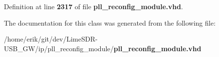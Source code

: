 Definition at line {\bf 2317} of file {\bf pll\+\_\+reconfig\+\_\+module.\+vhd}.



The documentation for this class was generated from the following file\+:\begin{DoxyCompactItemize}
\item 
/home/erik/git/dev/\+Lime\+S\+D\+R-\/\+U\+S\+B\+\_\+\+G\+W/ip/pll\+\_\+reconfig\+\_\+module/{\bf pll\+\_\+reconfig\+\_\+module.\+vhd}\end{DoxyCompactItemize}

